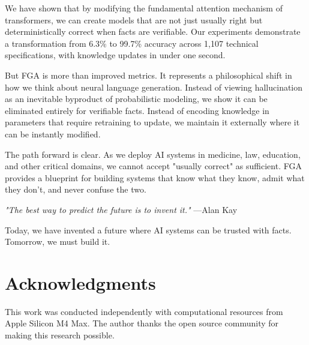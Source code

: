 \documentclass[11pt, a4paper]{article}
\theoremstyle{definition}
\begin{document}
We have shown that by modifying the fundamental attention mechanism of transformers, we can create models that are not just usually right but deterministically correct when facts are verifiable. Our experiments demonstrate a transformation from 6.3\% to 99.7\% accuracy across 1,107 technical specifications, with knowledge updates in under one second.

But FGA is more than improved metrics. It represents a philosophical shift in how we think about neural language generation. Instead of viewing hallucination as an inevitable byproduct of probabilistic modeling, we show it can be eliminated entirely for verifiable facts. Instead of encoding knowledge in parameters that require retraining to update, we maintain it externally where it can be instantly modified.

The path forward is clear. As we deploy AI systems in medicine, law, education, and other critical domains, we cannot accept "usually correct" as sufficient. FGA provides a blueprint for building systems that know what they know, admit what they don't, and never confuse the two.

\textit{"The best way to predict the future is to invent it."} —Alan Kay

Today, we have invented a future where AI systems can be trusted with facts. Tomorrow, we must build it.

\section*{Acknowledgments}

This work was conducted independently with computational resources from Apple Silicon M4 Max. The author thanks the open source community for making this research possible.




\end{document}
